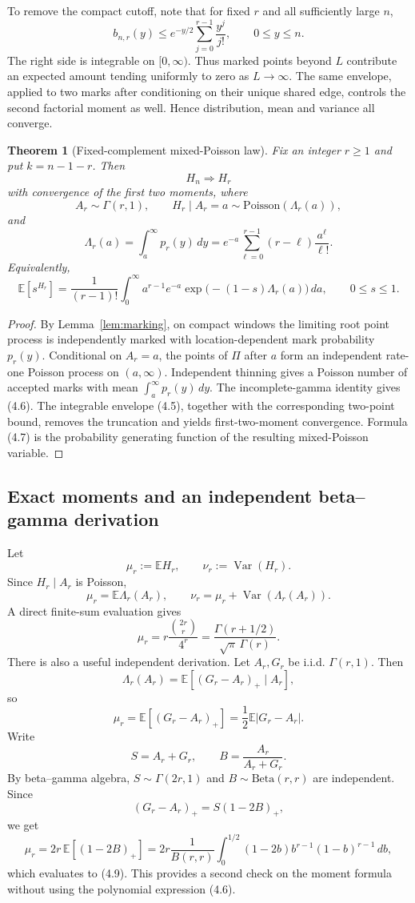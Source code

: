 \documentclass[11pt]{article}
\newtheorem{theorem}{Theorem}[section]
\theoremstyle{remark}
\newcommand{\E}{\mathbb E}
\newcommand{\Var}{\operatorname{Var}}
\newcommand{\1}{\mathbf 1}
\begin{document}
To remove the compact cutoff, note that for fixed $r$ and all sufficiently large $n$,
\[
b_{n,r}(y)
\le
 e^{-y/2}\sum_{j=0}^{r-1}\frac{y^j}{j!},
\qquad 0\le y\le n.
\tag{4.5}
\]
The right side is integrable on $[0,\infty)$. Thus marked points beyond $L$ contribute an expected amount tending uniformly to zero as $L\to\infty$. The same envelope, applied to two marks after conditioning on their unique shared edge, controls the second factorial moment as well. Hence distribution, mean and variance all converge.

\begin{theorem}[Fixed-complement mixed-Poisson law]\label{thm:fixedr}
Fix an integer $r\ge1$ and put $k=n-1-r$. Then
\[
H_n\Longrightarrow H_r
\]
with convergence of the first two moments, where
\[
A_r\sim\Gamma(r,1),
\qquad
H_r\mid A_r=a
\sim\mathrm{Poisson}(\Lambda_r(a)),
\]
and
\[
\Lambda_r(a)
=
\int_a^\infty p_r(y)\,dy
=
 e^{-a}\sum_{\ell=0}^{r-1}(r-\ell)\frac{a^\ell}{\ell!}.
\tag{4.6}
\]
Equivalently,
\[
\E[s^{H_r}]
=
\frac1{(r-1)!}
\int_0^\infty
 a^{r-1}e^{-a}
\exp\!\bigl(-(1-s)\Lambda_r(a)\bigr)\,da,
\qquad 0\le s\le1.
\tag{4.7}
\]
\end{theorem}

\begin{proof}
By Lemma~\ref{lem:marking}, on compact windows the limiting root point process is independently marked with location-dependent mark probability $p_r(y)$. Conditional on $A_r=a$, the points of $\Pi$ after $a$ form an independent rate-one Poisson process on $(a,\infty)$. Independent thinning gives a Poisson number of accepted marks with mean $\int_a^\infty p_r(y)\,dy$. The incomplete-gamma identity gives (4.6). The integrable envelope (4.5), together with the corresponding two-point bound, removes the truncation and yields first-two-moment convergence. Formula (4.7) is the probability generating function of the resulting mixed-Poisson variable.
\end{proof}

\subsection{Exact moments and an independent beta--gamma derivation}

Let
\[
\mu_r:=\E H_r,
\qquad
\nu_r:=\Var(H_r).
\]
Since $H_r\mid A_r$ is Poisson,
\[
\mu_r=\E\Lambda_r(A_r),
\qquad
\nu_r=\mu_r+\Var(\Lambda_r(A_r)).
\tag{4.8}
\]
A direct finite-sum evaluation gives
\[
\mu_r
=r\frac{\binom{2r}{r}}{4^r}
=
\frac{\Gamma(r+1/2)}{\sqrt\pi\,\Gamma(r)}.
\tag{4.9}
\]
There is also a useful independent derivation. Let $A_r,G_r$ be i.i.d. $\Gamma(r,1)$. Then
\[
\Lambda_r(A_r)=\E[(G_r-A_r)_+\mid A_r],
\]
so
\[
\mu_r=\E[(G_r-A_r)_+]=\frac12\E|G_r-A_r|.
\tag{4.10}
\]
Write
\[
S=A_r+G_r,
\qquad
B=\frac{A_r}{A_r+G_r}.
\]
By beta--gamma algebra, $S\sim\Gamma(2r,1)$ and $B\sim\mathrm{Beta}(r,r)$ are independent. Since
\[
(G_r-A_r)_+=S(1-2B)_+,
\]
we get
\[
\mu_r
=2r\,\E[(1-2B)_+]
=2r\frac{1}{B(r,r)}\int_0^{1/2}(1-2b)b^{r-1}(1-b)^{r-1}\,db,
\]
which evaluates to (4.9). This provides a second check on the moment formula without using the polynomial expression (4.6).
\end{document}
